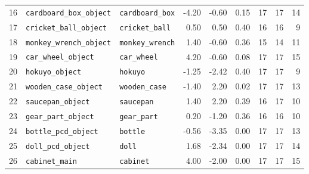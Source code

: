 \documentclass[conference]{IEEEtran}
\begin{document}
\begin{table}[t]
\begin{tabular}{@{}rllrrrrrr@{}}
16 & \texttt{cardboard\_box\_object} & \texttt{cardboard\_box} & -4.20 & -0.60 & 0.15 & 17 & 17 & 14 \\
17 & \texttt{cricket\_ball\_object} & \texttt{cricket\_ball} & 0.50 & 0.50 & 0.40 & 16 & 16 & 9 \\
18 & \texttt{monkey\_wrench\_object} & \texttt{monkey\_wrench} & 1.40 & -0.60 & 0.36 & 15 & 14 & 11 \\
19 & \texttt{car\_wheel\_object} & \texttt{car\_wheel} & 4.20 & -0.60 & 0.08 & 17 & 17 & 15 \\
20 & \texttt{hokuyo\_object} & \texttt{hokuyo} & -1.25 & -2.42 & 0.40 & 17 & 17 & 9 \\
21 & \texttt{wooden\_case\_object} & \texttt{wooden\_case} & -1.40 & 2.20 & 0.02 & 17 & 17 & 13 \\
22 & \texttt{saucepan\_object} & \texttt{saucepan} & 1.40 & 2.20 & 0.39 & 16 & 17 & 10 \\
23 & \texttt{gear\_part\_object} & \texttt{gear\_part} & 0.20 & -1.20 & 0.36 & 16 & 16 & 10 \\
24 & \texttt{bottle\_pcd\_object} & \texttt{bottle} & -0.56 & -3.35 & 0.00 & 17 & 17 & 13 \\
25 & \texttt{doll\_pcd\_object} & \texttt{doll} & 1.68 & -2.34 & 0.00 & 17 & 17 & 14 \\
26 & \texttt{cabinet\_main} & \texttt{cabinet} & 4.00 & -2.00 & 0.00 & 17 & 17 & 15 \\
\bottomrule
\end{tabular}
\end{table}
\end{document}
